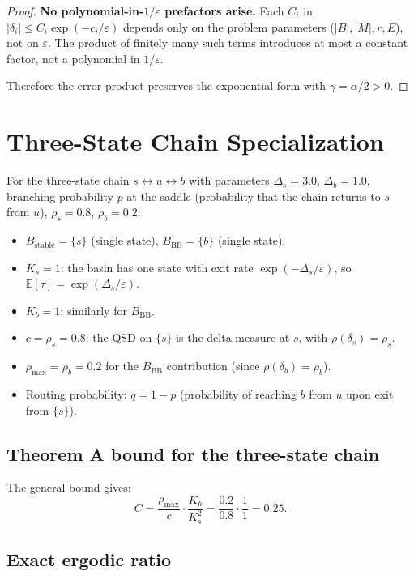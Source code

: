 \documentclass[11pt]{article}
\newcommand{\eps}{\varepsilon}
\newcommand{\Ds}{\Delta_s}
\newcommand{\Db}{\Delta_b}
\newcommand{\Bstable}{B_{\mathrm{stable}}}
\newcommand{\BBB}{B_{\mathrm{BB}}}
\begin{document}
\begin{proof}
\textbf{No polynomial-in-$1/\eps$ prefactors arise.}
Each $C_i$ in $|\delta_i| \leq C_i \exp(-c_i/\eps)$ depends only
on the problem parameters ($|B|, |M|, r, E$), not on $\eps$.
The product of finitely many such terms introduces at
most a constant factor, not a polynomial in $1/\eps$.

Therefore the error product preserves the exponential form with
$\gamma = \alpha/2 > 0$.
\end{proof}

\section{Three-State Chain Specialization}
\label{sec:three-state}

For the three-state chain $s \leftrightarrow u \leftrightarrow b$
with parameters $\Ds = 3.0$, $\Db = 1.0$, branching probability $p$
at the saddle (probability that the chain returns to $s$ from $u$),
$\rho_s = 0.8$, $\rho_b = 0.2$:

\begin{itemize}
\item $\Bstable = \{s\}$ (single state), $\BBB = \{b\}$ (single state).
\item $K_s = 1$: the basin has one state with exit rate
  $\exp(-\Ds/\eps)$, so $\mathbb{E}[\tau] = \exp(\Ds/\eps)$.
\item $K_b = 1$: similarly for $\BBB$.
\item $c = \rho_s = 0.8$: the QSD on $\{s\}$ is the delta
  measure at $s$, with $\rho(\delta_s) = \rho_s$.
\item $\rho_{\max} = \rho_b = 0.2$ for the $\BBB$ contribution
  (since $\rho(\delta_b) = \rho_b$).
\item Routing probability: $q = 1 - p$ (probability of reaching
  $b$ from $u$ upon exit from $\{s\}$).
\end{itemize}

\subsection*{Theorem A bound for the three-state chain}

The general bound gives:
\[
  C = \frac{\rho_{\max}}{c} \cdot \frac{K_b}{K_s^2}
  = \frac{0.2}{0.8} \cdot \frac{1}{1} = 0.25.
\]

\subsection*{Exact ergodic ratio}
\end{document}
